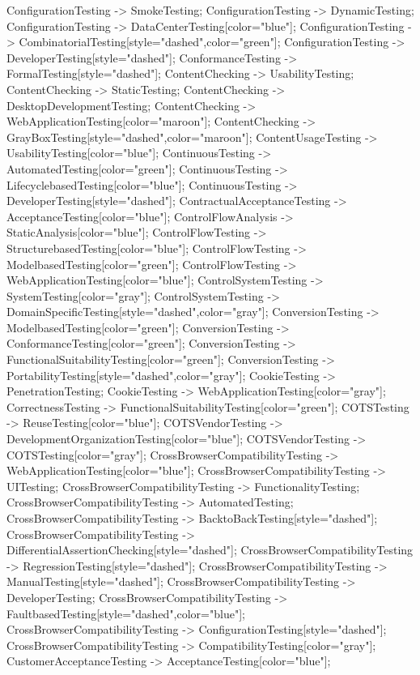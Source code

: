 \documentclass{article}
\begin{document}
{ConfigurationTesting -> SmokeTesting;
ConfigurationTesting -> DynamicTesting;
ConfigurationTesting -> DataCenterTesting[color="blue"];
ConfigurationTesting -> CombinatorialTesting[style="dashed",color="green"];
ConfigurationTesting -> DeveloperTesting[style="dashed"];
ConformanceTesting -> FormalTesting[style="dashed"];
ContentChecking -> UsabilityTesting;
ContentChecking -> StaticTesting;
ContentChecking -> DesktopDevelopmentTesting;
ContentChecking -> WebApplicationTesting[color="maroon"];
ContentChecking -> GrayBoxTesting[style="dashed",color="maroon"];
ContentUsageTesting -> UsabilityTesting[color="blue"];
ContinuousTesting -> AutomatedTesting[color="green"];
ContinuousTesting -> LifecyclebasedTesting[color="blue"];
ContinuousTesting -> DeveloperTesting[style="dashed"];
ContractualAcceptanceTesting -> AcceptanceTesting[color="blue"];
ControlFlowAnalysis -> StaticAnalysis[color="blue"];
ControlFlowTesting -> StructurebasedTesting[color="blue"];
ControlFlowTesting -> ModelbasedTesting[color="green"];
ControlFlowTesting -> WebApplicationTesting[color="blue"];
ControlSystemTesting -> SystemTesting[color="gray"];
ControlSystemTesting -> DomainSpecificTesting[style="dashed",color="gray"];
ConversionTesting -> ModelbasedTesting[color="green"];
ConversionTesting -> ConformanceTesting[color="green"];
ConversionTesting -> FunctionalSuitabilityTesting[color="green"];
ConversionTesting -> PortabilityTesting[style="dashed",color="gray"];
CookieTesting -> PenetrationTesting;
CookieTesting -> WebApplicationTesting[color="gray"];
CorrectnessTesting -> FunctionalSuitabilityTesting[color="green"];
COTSTesting -> ReuseTesting[color="blue"];
COTSVendorTesting -> DevelopmentOrganizationTesting[color="blue"];
COTSVendorTesting -> COTSTesting[color="gray"];
CrossBrowserCompatibilityTesting -> WebApplicationTesting[color="blue"];
CrossBrowserCompatibilityTesting -> UITesting;
CrossBrowserCompatibilityTesting -> FunctionalityTesting;
CrossBrowserCompatibilityTesting -> AutomatedTesting;
CrossBrowserCompatibilityTesting -> BacktoBackTesting[style="dashed"];
CrossBrowserCompatibilityTesting -> DifferentialAssertionChecking[style="dashed"];
CrossBrowserCompatibilityTesting -> RegressionTesting[style="dashed"];
CrossBrowserCompatibilityTesting -> ManualTesting[style="dashed"];
CrossBrowserCompatibilityTesting -> DeveloperTesting;
CrossBrowserCompatibilityTesting -> FaultbasedTesting[style="dashed",color="blue"];
CrossBrowserCompatibilityTesting -> ConfigurationTesting[style="dashed"];
CrossBrowserCompatibilityTesting -> CompatibilityTesting[color="gray"];
CustomerAcceptanceTesting -> AcceptanceTesting[color="blue"];
}
\end{document}
